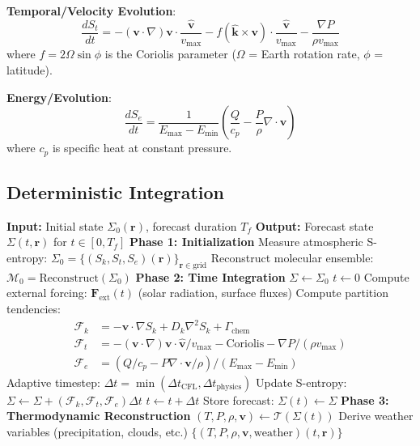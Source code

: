 \documentclass[twocolumn,10pt,a4paper]{article}
\theoremstyle{definition}
\theoremstyle{remark}
\begin{document}
\textbf{Temporal/Velocity Evolution}:
\begin{equation}
    \frac{dS_t}{dt} = -(\mathbf{v} \cdot \nabla)\mathbf{v} \cdot \frac{\hat{\mathbf{v}}}{v_{\text{max}}} - f(\hat{\mathbf{k}} \times \mathbf{v}) \cdot \frac{\hat{\mathbf{v}}}{v_{\text{max}}} - \frac{\nabla P}{\rho v_{\text{max}}}
\end{equation}
where $f = 2\Omega\sin\phi$ is the Coriolis parameter ($\Omega$ = Earth rotation rate, $\phi$ = latitude).

\textbf{Energy/Evolution}:
\begin{equation}
    \frac{dS_e}{dt} = \frac{1}{E_{\text{max}} - E_{\text{min}}}\left(\frac{Q}{c_p} - \frac{P}{\rho}\nabla \cdot \mathbf{v}\right)
\end{equation}
where $c_p$ is specific heat at constant pressure.

\subsection{Deterministic Integration}

\begin{algorithm}[H]
\caption{Partition Dynamics Weather Prediction}
\label{alg:weather}
\begin{algorithmic}[1]
\STATE \textbf{Input:} Initial state $\Sigma_0(\mathbf{r})$, forecast duration $T_f$
\STATE \textbf{Output:} Forecast state $\Sigma(t, \mathbf{r})$ for $t \in [0, T_f]$
\STATE
\STATE \textbf{Phase 1: Initialization}
\STATE Measure atmospheric S-entropy: $\Sigma_0 = \{(S_k, S_t, S_e)(\mathbf{r})\}_{\mathbf{r} \in \text{grid}}$
\STATE Reconstruct molecular ensemble: $\mathcal{M}_0 = \text{Reconstruct}(\Sigma_0)$
\STATE
\STATE \textbf{Phase 2: Time Integration}
\STATE $\Sigma \gets \Sigma_0$
\STATE $t \gets 0$
    \STATE Compute external forcing: $\mathbf{F}_{\text{ext}}(t)$ (solar radiation, surface fluxes)
    \STATE Compute partition tendencies:
    \begin{align*}
        \mathcal{F}_k &= -\mathbf{v} \cdot \nabla S_k + D_k \nabla^2 S_k + \Gamma_{\text{chem}} \\
        \mathcal{F}_t &= -(\mathbf{v} \cdot \nabla)\mathbf{v} \cdot \hat{\mathbf{v}}/v_{\max} - \text{Coriolis} - \nabla P/(\rho v_{\max}) \\
        \mathcal{F}_e &= (Q/c_p - P\nabla \cdot \mathbf{v}/\rho)/(E_{\max} - E_{\min})
    \end{align*}
    \STATE Adaptive timestep: $\Delta t = \min(\Delta t_{\text{CFL}}, \Delta t_{\text{physics}})$
    \STATE Update S-entropy: $\Sigma \gets \Sigma + (\mathcal{F}_k, \mathcal{F}_t, \mathcal{F}_e) \Delta t$
    \STATE $t \gets t + \Delta t$
    \STATE Store forecast: $\Sigma(t) \gets \Sigma$
\ENDWHILE
\STATE
\STATE \textbf{Phase 3: Thermodynamic Reconstruction}
    \STATE $(T, P, \rho, \mathbf{v}) \gets \mathcal{T}(\Sigma(t))$
    \STATE Derive weather variables (precipitation, clouds, etc.)
\ENDFOR
\STATE
\RETURN $\{(T, P, \rho, \mathbf{v}, \text{weather})(t, \mathbf{r})\}$
\end{algorithmic}
\end{algorithm}
\end{document}
